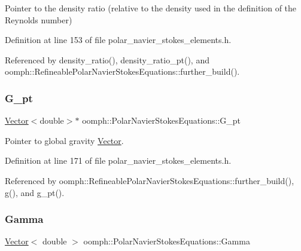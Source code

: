 Pointer to the density ratio (relative to the density used in the definition of the Reynolds number) 



Definition at line 153 of file polar\+\_\+navier\+\_\+stokes\+\_\+elements.\+h.



Referenced by density\+\_\+ratio(), density\+\_\+ratio\+\_\+pt(), and oomph\+::\+Refineable\+Polar\+Navier\+Stokes\+Equations\+::further\+\_\+build().

\mbox{\label{classoomph_1_1PolarNavierStokesEquations_a31ccd82266f001f15ce0a6a32b807c44}} 
\subsubsection{\texorpdfstring{G\+\_\+pt}{G\_pt}}
{\footnotesize\ttfamily \hyperlink{classoomph_1_1Vector}{Vector}$<$double$>$$\ast$ oomph\+::\+Polar\+Navier\+Stokes\+Equations\+::\+G\+\_\+pt\hspace{0.3cm}{\ttfamily [protected]}}



Pointer to global gravity \hyperlink{classoomph_1_1Vector}{Vector}. 



Definition at line 171 of file polar\+\_\+navier\+\_\+stokes\+\_\+elements.\+h.



Referenced by oomph\+::\+Refineable\+Polar\+Navier\+Stokes\+Equations\+::further\+\_\+build(), g(), and g\+\_\+pt().

\mbox{\label{classoomph_1_1PolarNavierStokesEquations_a3370b89e66379cb0b53417db39357e77}} 
\subsubsection{\texorpdfstring{Gamma}{Gamma}}
{\footnotesize\ttfamily \hyperlink{classoomph_1_1Vector}{Vector}$<$ double $>$ oomph\+::\+Polar\+Navier\+Stokes\+Equations\+::\+Gamma\hspace{0.3cm}{\ttfamily [static]}}



